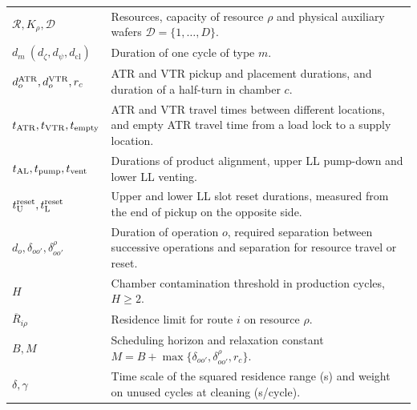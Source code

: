 \documentclass[final,5p,times,twocolumn]{elsarticle}
\begin{document}
\begin{table}[!t]
\begin{tabular}{@{}C{0.20\textwidth}C{\textwidth-8pt\relax}@{}}
$\mathcal R,K_\rho,\mathcal D$ & Resources, capacity of resource $\rho$ and physical auxiliary wafers $\mathcal D=\{1,\ldots,D\}$.\\
$d_m\ (d_\zeta,d_\psi,d_{\mathrm{cl}})$ & Duration of one cycle of type $m$.\\
$d_o^{\rm ATR},d_o^{\rm VTR},r_c$ & ATR and VTR pickup and placement durations, and duration of a half-turn in chamber $c$.\\
$t_{\rm ATR},t_{\rm VTR},t_{\rm empty}$ & ATR and VTR travel times between different locations, and empty ATR travel time from a load lock to a supply location.\\
$t_{\rm AL},t_{\rm pump},t_{\rm vent}$ & Durations of product alignment, upper LL pump-down and lower LL venting.\\
$t_{\rm U}^{\rm reset},t_{\rm L}^{\rm reset}$ & Upper and lower LL slot reset durations, measured from the end of pickup on the opposite side.\\
$d_o,\delta_{oo'},\delta^\rho_{oo'}$ & Duration of operation $o$, required separation between successive operations and separation for resource travel or reset.\\
$H$ & Chamber contamination threshold in production cycles, $H\ge2$.\\
$\overline R_{i\rho}$ & Residence limit for route $i$ on resource $\rho$.\\
$B,M$ & Scheduling horizon and relaxation constant $M=B+\max\{\delta_{oo'},\delta^\rho_{oo'},r_c\}$.\\
$\delta,\gamma$ & Time scale of the squared residence range (s) and weight on unused cycles at cleaning (s/cycle).\\
\bottomrule
\end{tabular}
\end{table}
\end{document}
